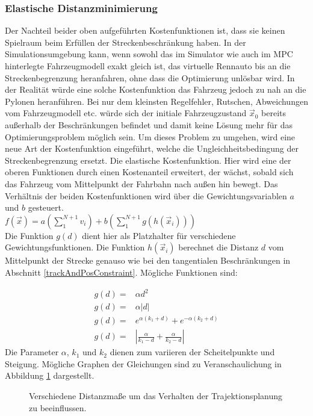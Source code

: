 \documentclass{like}
\begin{document}
\subsubsection*{Elastische Distanzminimierung}
Der Nachteil beider oben aufgeführten Kostenfunktionen ist, dass sie keinen Spielraum beim Erfüllen der Streckenbeschränkung haben. In der Simulationsumgebung kann, wenn sowohl das im Simulator wie auch im \ac{MPC} hinterlegte Fahrzeugmodell exakt gleich ist, das virtuelle Rennauto bis an die Streckenbegrenzung heranfahren, ohne dass die Optimierung unlösbar wird. In der Realität würde eine solche Kostenfunktion das Fahrzeug jedoch zu nah an die Pylonen heranführen. Bei nur dem kleinsten Regelfehler, Rutschen, Abweichungen vom Fahrzeugmodell etc. würde sich der initiale Fahrzeugzustand $\vec{x}_0$ bereits außerhalb der Beschränkungen befindet und damit keine Lösung mehr für das Optimierungsproblem möglich sein. Um dieses Problem zu umgehen, wird eine neue Art der Kostenfunktion eingeführt, welche die Ungleichheitsbedingung der Streckenbegrenzung ersetzt. Die elastische Kostenfunktion. Hier wird eine der oberen Funktionen durch einen Kostenanteil erweitert, der wächst, sobald sich das Fahrzeug vom Mittelpunkt der Fahrbahn nach außen hin bewegt. Das Verhältnis der beiden Kostenfunktionen wird über die Gewichtungsvariablen \(a\) und \(b\) gesteuert.\\
$f(\vec{x}) = a (\sum_{1}^{N+1} v_i) + b(\sum_{1}^{N+1} g(h(\vec{x}_i)))$  \\
Die Funktion $g(d)$ dient hier als Platzhalter für verschiedene Gewichtungsfunktionen. Die Funktion $h(\vec{x}_i)$ berechnet die Distanz \(d\) vom Mittelpunkt der Strecke genauso wie bei den tangentialen Beschränkungen in Abschnitt \ref{trackAndPosConstraint}. Mögliche Funktionen sind:

\begin{eqnarray}
	g(d) = &\alpha d^2 \\
	g(d) = &\alpha |d|\\
	g(d) = &e^{\alpha (k_1 + d)} + e^{-\alpha(k_2 + d)} \label{eq:distMeasure1}\\
	g(d) = &|\frac{\alpha}{k_1-d} + \frac{\alpha}{k_2 - d}| \label{eq:distMeasure2}
\end{eqnarray}
Die Parameter $\alpha$, $k_1$ und $k_2$ dienen zum variieren der Scheitelpunkte und Steigung.
Mögliche Graphen der Gleichungen sind zu Veranschaulichung in Abbildung \ref{fig:elasticCost} dargestellt.

\begin{figure}[ht!]
	\centering
	 
	\caption{Verschiedene Distanzmaße um das Verhalten der Trajektionsplanung zu beeinflussen.}
	\label{fig:elasticCost}
\end{figure}
\end{document}
